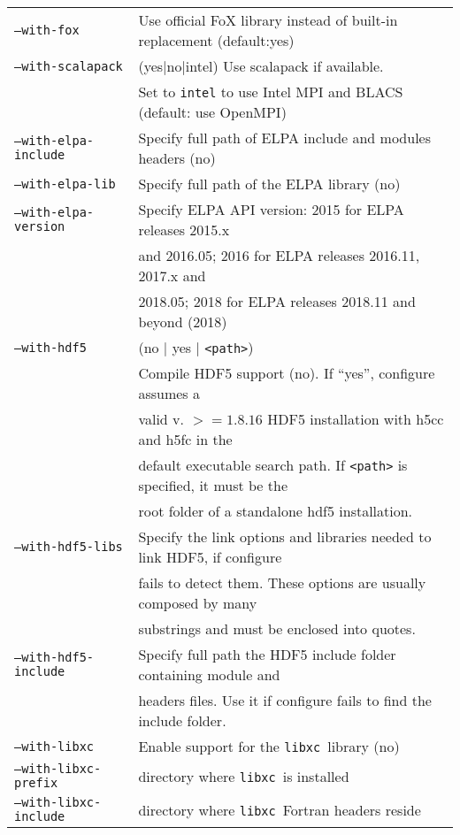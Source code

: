 \documentclass[12pt,a4paper]{article}
\def\libxc{\texttt{libxc}}
\begin{document}
\begin{tabular}{ll}
\texttt{--with-fox} & Use official FoX library instead of built-in replacement (default:yes)\\
\texttt{--with-scalapack}& (yes$|$no$|$intel) Use scalapack if available. \\
      &Set to \texttt{intel} to use Intel MPI and BLACS (default: use OpenMPI)\\
\texttt{--with-elpa-include}&   Specify full path of ELPA include and modules
  headers (no)\\
\texttt{--with-elpa-lib}& Specify full path of the ELPA library (no)\\
\texttt{--with-elpa-version}& Specify ELPA API version: 2015 for ELPA releases 2015.x\\
                            & and 2016.05; 2016 for ELPA releases 2016.11, 2017.x and\\
			    & 2018.05; 2018 for ELPA releases 2018.11 and beyond (2018)\\
\texttt{--with-hdf5}&  (no $|$  yes $|$ \texttt{<path>}) \\
	                    & Compile HDF5 support (no). If ``yes'', configure assumes a \\
                            & valid v. $>=1.8.16$ HDF5 installation with h5cc and h5fc in the \\
                            &  default executable search path. If \texttt{<path>} is specified, it must be the  \\
                            & root folder of a standalone hdf5 installation. \\
\texttt{--with-hdf5-libs}   & Specify the link options and libraries needed to link HDF5, if configure \\
                            &  fails to detect them. These options are usually composed by many \\
                            & substrings and must be enclosed into quotes. \\
\texttt{--with-hdf5-include}& Specify full path the HDF5 include folder containing module and \\
&  headers files. Use it if configure fails to find the include folder. \\
\texttt{--with-libxc}        & Enable support for the \libxc\ library (no) \\
\texttt{--with-libxc-prefix} & directory where \libxc\ is installed \\
\texttt{--with-libxc-include}& directory where \libxc\ Fortran headers reside\\
\end{tabular}\\
\end{document}
